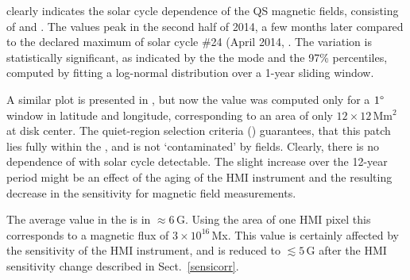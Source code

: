 \documentclass{aa}
\begin{document}
 clearly indicates the solar cycle dependence of the 
QS
magnetic fields, consisting of \NW{} and \IN{}. The \brms{} values peak in the second half of 2014, %
a few months later compared to the
declared maximum of solar cycle \#24 (April 2014, . The variation is statistically significant, as indicated by the the mode and the 97\% percentiles, computed by fitting a log-normal distribution over a 1-year sliding window.

A similar plot is presented in , but now the \brms{} value was computed only for a $1\degree$ window in latitude and longitude, corresponding to an area of only $12\times 12$\,Mm$^2$ at disk center. The quiet-region selection criteria () guarantees, that this patch lies fully within the \IN{}, and is not `contaminated' by \NW{} fields. Clearly, there is no dependence of \brms{} with solar cycle detectable. The 
slight increase over the 12-year period might be an effect of the aging of the HMI instrument and the resulting decrease in the sensitivity for magnetic field measurements.

The average \brms{} value in the \IN{} is in $\approx6$\,G. Using the area of one HMI pixel this corresponds to a magnetic flux of $3\times 10^{16}$\,Mx. 
This value is certainly affected by the sensitivity of the HMI instrument, and is reduced to $\lesssim5$\,G after the HMI sensitivity change described in Sect.~\ref{sensicorr}.



\end{document}
